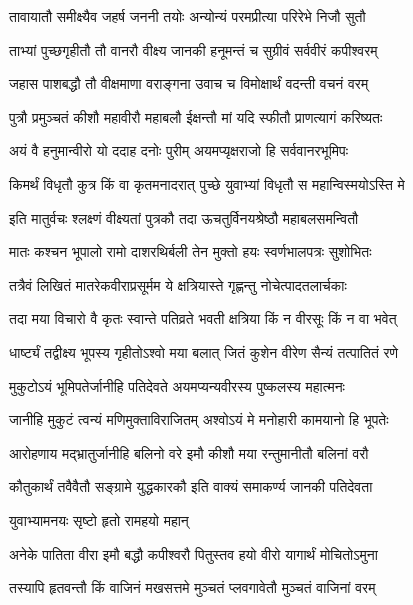 \twolineshloka
{तावायातौ समीक्ष्यैव जहर्ष जननी तयोः}
{अन्योन्यं परमप्रीत्या परिरेभे निजौ सुतौ}%

\twolineshloka
{ताभ्यां पुच्छगृहीतौ तौ वानरौ वीक्ष्य जानकी}
{हनूमन्तं च सुग्रीवं सर्ववीरं कपीश्वरम्}%

\twolineshloka
{जहास पाशबद्धौ तौ वीक्षमाणा वराङ्गना}
{उवाच च विमोक्षार्थं वदन्ती वचनं वरम्}%

\twolineshloka
{पुत्रौ प्रमुञ्चतं कीशौ महावीरौ महाबलौ}
{ईक्षन्तौ मां यदि स्फीतौ प्राणत्यागं करिष्यतः}%

\twolineshloka
{अयं वै हनुमान्वीरो यो ददाह दनोः पुरीम्}
{अयमप्यृक्षराजो हि सर्ववानरभूमिपः}%

\twolineshloka
{किमर्थं विधृतौ कुत्र किं वा कृतमनादरात्}
{पुच्छे युवाभ्यां विधृतौ स महान्विस्मयोऽस्ति मे}%

\twolineshloka
{इति मातुर्वचः श्लक्ष्णं वीक्ष्यतां पुत्रकौ तदा}
{ऊचतुर्विनयश्रेष्ठौ महाबलसमन्वितौ}%

\twolineshloka
{मातः कश्चन भूपालो रामो दाशरथिर्बली}
{तेन मुक्तो हयः स्वर्णभालपत्रः सुशोभितः}%

\twolineshloka
{तत्रैवं लिखितं मातरेकवीराप्रसूर्मम}
{ये क्षत्रियास्ते गृह्णन्तु नोचेत्पादतलार्चकाः}%

\twolineshloka
{तदा मया विचारो वै कृतः स्वान्ते पतिव्रते}
{भवती क्षत्रिया किं न वीरसूः किं न वा भवेत्}%

\twolineshloka
{धार्ष्ट्यं तद्वीक्ष्य भूपस्य गृहीतोऽश्वो मया बलात्}
{जितं कुशेन वीरेण सैन्यं तत्पातितं रणे}%

\twolineshloka
{मुकुटोऽयं भूमिपतेर्जानीहि पतिदेवते}
{अयमप्यन्यवीरस्य पुष्कलस्य महात्मनः}%

\twolineshloka
{जानीहि मुकुटं त्वन्यं मणिमुक्ताविराजितम्}
{अश्वोऽयं मे मनोहारी कामयानो हि भूपतेः}%

\twolineshloka
{आरोहणाय मद्भ्रातुर्जानीहि बलिनो वरे}
{इमौ कीशौ मया रन्तुमानीतौ बलिनां वरौ}%

\twolineshloka
{कौतुकार्थं तवैवैतौ सङ्ग्रामे युद्धकारकौ}
{इति वाक्यं समाकर्ण्य जानकी पतिदेवता}%



\onelineshloka
{युवाभ्यामनयः सृष्टो हृतो रामहयो महान्}%

\twolineshloka
{अनेके पातिता वीरा इमौ बद्धौ कपीश्वरौ}
{पितुस्तव हयो वीरो यागार्थं मोचितोऽमुना}%

\twolineshloka
{तस्यापि हृतवन्तौ किं वाजिनं मखसत्तमे}
{मुञ्चतं प्लवगावेतौ मुञ्चतं वाजिनां वरम्}%

